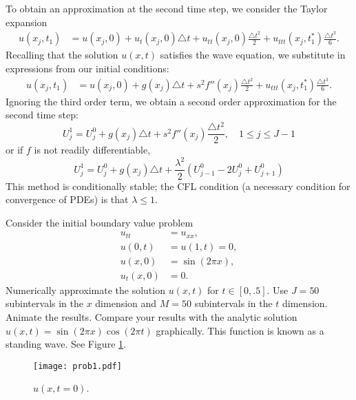 To obtain an approximation at the second time step, we consider the Taylor expansion
\begin{align*}
	u(x_j,t_1) &= u(x_j, 0) + u_t(x_j,0) \triangle t + u_{tt}(x_j,0) \frac{\triangle t^2}{2} + u_{ttt}(x_j,t_1^*) \frac{\triangle t^3}{6}.
\end{align*}
Recalling that the solution $u(x,t)$ satisfies the wave equation, we substitute in expressions from our initial conditions:
\begin{align*}
	u(x_j,t_1) &= u(x_j, 0) +  g(x_j) \triangle t+ s^2 f''(x_j)\frac{\triangle t^2}{2} +  u_{ttt}(x_j,t_1^*) \frac{\triangle t^3}{6}.
\end{align*}
Ignoring the third order term, we obtain a second order approximation for the second time step:
\[U_{j}^{1}= U_{j}^{0} + g(x_j) \triangle t+ s^2 f''(x_j) \frac{\triangle t^2}{2}, \quad 1 \leq j \leq J-1\]
or if $f$ is not readily differentiable,
\[U_{j}^{1}= U_{j}^{0} + g(x_j) \triangle t+ \frac{\lambda^2}{2} (U^0_{j-1} -2 U^0_j + U^0_{j+1})\]
This method is conditionally stable; the CFL condition (a necessary condition for convergence of PDEs) is that $\lambda \leq 1$.

\begin{problem}
\label{prob:prob1}
Consider the initial boundary value problem
\begin{align*}
	u_{tt} &= u_{xx}, \\
	u(0,t) &= u(1,t) = 0, \\
	u(x,0) &= \sin(2 \pi x),\\
	u_t(x,0) &= 0.
\end{align*}
Numerically approximate the solution $u(x,t)$ for $t \in \left[0,.5\right]$.
Use $J=50$ subintervals in the $x$ dimension and $M=50$ subintervals in the $t$ dimension.
Animate the results.
Compare your results with the analytic solution $u(x,t) = \sin{(2 \pi x)} \cos{(2 \pi t)}$ graphically.
This function is known as a standing wave.
See Figure \ref{fig:prob1}.

\begin{figure}[H]
\centering
\texttt{[image: prob1.pdf]}
\caption{$u(x,t=0)$.}
\label{fig:prob1}
\end{figure}
\end{problem}

